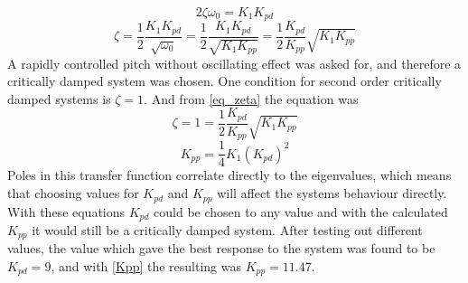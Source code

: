     \begin{equation*}
        2 \zeta \omega_0 = K_1 K_{pd}
    \end{equation*}
    \begin{equation} \label{eq_zeta}
        \zeta = \frac{1}{2} \frac{K_1 K_{pd}}{\sqrt{\omega_0}} = \frac{1}{2} \frac{K_1 K_{pd}}{\sqrt{K_1 K_{pp}}} = \frac{1}{2} \frac{K_{pd}}{K_{pp}}\sqrt{K_1 K_{pp}}
    \end{equation}
A rapidly controlled pitch without oscillating effect was asked for, and therefore a critically damped system was chosen. One condition for second order critically damped systems is $\zeta = 1$. And from \eqref{eq_zeta} the equation was
    \begin{equation*}
       \zeta = 1 = \frac{1}{2} \frac{K_{pd}}{K_{pp}}\sqrt{K_1 K_{pp}}
    \end{equation*}
    \begin{equation}\label{Kpp}
        K_{pp} = \frac{1}{4} K_1 (K_{pd})^2
    \end{equation}
Poles in this transfer function correlate directly to the eigenvalues, which means that choosing values for $K_{pd}$ and $K_{pp}$ will affect the systems behaviour directly. With these equations $K_{pd}$ could be chosen to any value and with the calculated $K_{pp}$ it would still be a critically damped system. After testing out different values, the value which gave the best response to the system was found to be $K_{pd} = 9$, and with \eqref{Kpp} the resulting was $K_{pp} = 11.47$.


